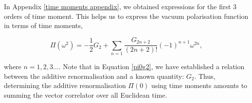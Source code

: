 \documentclass{article}
\numberwithin{equation}{section} %
\begin{document}
%

In Appendix \ref{time moments appendix}, we obtained expressions for the first 3 orders of time moment. This helps us to express the vacuum polarisation function in terms of time moments,

\begin{equation}
\Pi(\omega^2) = -\frac{1}{2}G_2 + \sum_{n=1} \frac{G_{2n+2}}{(2n+2)!}(-1)^{n+1} \omega^{2n},
\label{pi in terms of time moments}
\end{equation}

\noindent where $n=1,2,3...$. Note that in Equation \ref{pi0g2}, we have established a relation between the additive renormalisation and a known quantity: $G_2$. Thus, determining the additive renormalisation $\Pi(0)$ using time moments amounts to summing the vector correlator over all Euclidean time. 
\end{document}
